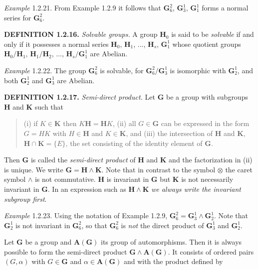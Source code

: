 \documentclass[11pt,a4paper,twoside,openright]{book}
\begin{document}
\textit{Example} 1.2.21. From Example 1.2.9 it follows that $\mathbf{G}_6^2$, $\mathbf{G}_3^1$, $\mathbf{G}_1^1$ forms a normal series for $\mathbf{G}_6^2$.

\textbf{DEFINITION 1.2.16.} \textit{Solvable groups.} A group $\mathbf{H}_{0}$ is said to be \textit{solvable} if and only if it possesses a normal series $\mathbf{H}_{0}$, $\mathbf{H}_{1}$, ..., $\mathbf{H}_{s}$, $\mathbf{G}_1^1$ whose quotient groups $\mathbf{H}_{0}/\mathbf{H}_{1}$, $\mathbf{H}_{1}/\mathbf{H}_{2}$, ..., $\mathbf{H}_{s}/\mathbf{G}_1^1$ are Abelian.

\textit{Example} 1.2.22. The group $\mathbf{G}_6^2$ is solvable, for $\mathbf{G}_6^2/\mathbf{G}_3^1$ is isomorphic with $\mathbf{G}_2^1$, and both $\mathbf{G}_2^1$ and $\mathbf{G}_3^1$ are Abelian.

\textbf{DEFINITION 1.2.17.} \textit{Semi-direct product.} Let $\mathbf{G}$ be a group with subgroups $\mathbf{H}$ and $\mathbf{K}$ such that

\begin{quote}(i) if $K \in \mathbf{K}$ then $K\mathbf{H} = \mathbf{H}K$, (ii) all $G \in \mathbf{G}$ can be expressed in the form $G = HK$ with $H \in \mathbf{H}$ and $K \in \mathbf{K}$, and (iii) the intersection of $\mathbf{H}$ and $\mathbf{K}$, $\mathbf{H} \cap \mathbf{K} = \{E\}$, the set consisting of the identity element of $\mathbf{G}$.\end{quote}

Then $\mathbf{G}$ is called the \textit{semi-direct product} of $\mathbf{H}$ and $\mathbf{K}$ and the factorization in (ii) is unique. We write $\mathbf{G} = \mathbf{H} \wedge \mathbf{K}$. Note that in contrast to the symbol $\otimes$ the caret symbol $\wedge$ is not commutative. $\mathbf{H}$ is invariant in $\mathbf{G}$ but $\mathbf{K}$ is not necessarily invariant in $\mathbf{G}$. In an expression such as $\mathbf{H} \wedge \mathbf{K}$ \textit{we always write the invariant subgroup first}.

\textit{Example} 1.2.23. Using the notation of Example 1.2.9, $\mathbf{G}_6^2 = \mathbf{G}_3^1 \wedge \mathbf{G}_2^1$. Note that $\mathbf{G}_2^1$ is not invariant in $\mathbf{G}_6^2$, so that $\mathbf{G}_6^2$ is \textit{not} the direct product of $\mathbf{G}_3^1$ and $\mathbf{G}_2^1$.

Let $\mathbf{G}$ be a group and $\mathbf{A}(\mathbf{G})$ its group of automorphisms. Then it is always possible to form the semi-direct product $\mathbf{G} \wedge \mathbf{A}(\mathbf{G})$. It consists of ordered pairs $(G, \alpha)$ with $G \in \mathbf{G}$ and $\alpha \in \mathbf{A}(\mathbf{G})$ and with the product defined by
\end{document}
